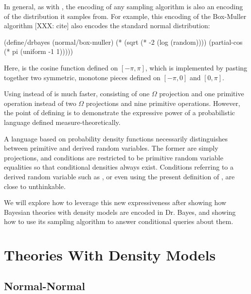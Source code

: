 In general, as with , the encoding of any sampling algorithm is also an encoding of the distribution it samples from.
For example, this encoding of the Box-Muller algorithm [XXX: cite] also encodes the standard normal distribution:
\begin{center}\singlespacing
\begin{schemedisplay}
(define/drbayes (normal/box-muller)
  (* (sqrt (* -2 (log (random))))
     (partial-cos (* pi (uniform -1 1)))))
\end{schemedisplay}
\end{center}
Here,  is the cosine function defined on $[-\pi,\pi]$, which is implemented by pasting together two symmetric, monotone pieces defined on $[-\pi,0]$ and $[0,\pi]$.

Using  instead of  is much faster, consisting of one $\Omega$ projection and one primitive operation instead of two $\Omega$ projections and nine primitive operations.
However, the point of defining  is to demonstrate the expressive power of a probabilistic language defined measure-theoretically.

A language based on probability density functions necessarily distinguishes between primitive and derived random variables.
The former are simply projections, and conditions are restricted to be primitive random variable equalities so that conditional densities always exist.
Conditions referring to a derived random variable such as , or even  using the present definition of , are close to unthinkable.

We will explore how to leverage this new expressiveness after showing how Bayesian theories with density models are encoded in Dr. Bayes, and showing how to use its sampling algorithm to answer conditional queries about them.

\section{Theories With Density Models}

\subsection{Normal-Normal}

